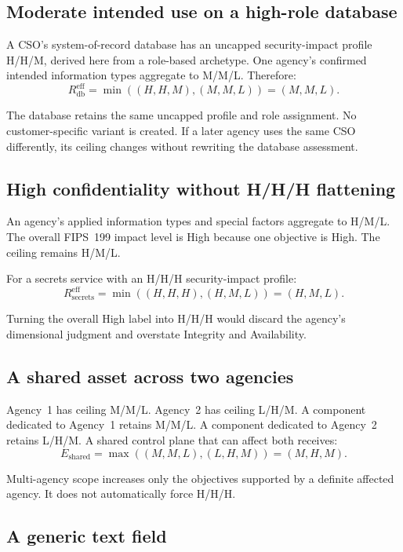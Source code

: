 \documentclass[11pt]{article}
\begin{document}
\subsection{Moderate intended use on a high-role database}

A CSO's system-of-record database has an uncapped security-impact profile H/H/M,
derived here from a role-based archetype. One agency's
confirmed intended information types aggregate to M/M/L. Therefore:
\[
R_{\mathrm{db}}^{\mathrm{eff}}
=\min((H,H,M),(M,M,L))=(M,M,L).
\]

The database retains the same uncapped profile and role assignment. No
customer-specific variant is created. If a later agency uses the same CSO
differently, its ceiling changes without rewriting the database assessment.

\subsection{High confidentiality without H/H/H flattening}

An agency's applied information types and special factors aggregate to H/M/L. The
overall FIPS~199 impact level is High because one objective is High. The ceiling
remains H/M/L.

For a secrets service with an H/H/H security-impact profile:
\[
R_{\mathrm{secrets}}^{\mathrm{eff}}
=\min((H,H,H),(H,M,L))=(H,M,L).
\]

Turning the overall High label into H/H/H would discard the agency's dimensional
judgment and overstate Integrity and Availability.

\subsection{A shared asset across two agencies}

Agency~1 has ceiling M/M/L. Agency~2 has ceiling L/H/M. A component dedicated to
Agency~1 retains M/M/L. A component dedicated to Agency~2 retains L/H/M. A shared
control plane that can affect both receives:
\[
E_{\mathrm{shared}}
=\max((M,M,L),(L,H,M))=(M,H,M).
\]

Multi-agency scope increases only the objectives supported by a definite affected
agency. It does not automatically force H/H/H.

\subsection{A generic text field}
\end{document}
